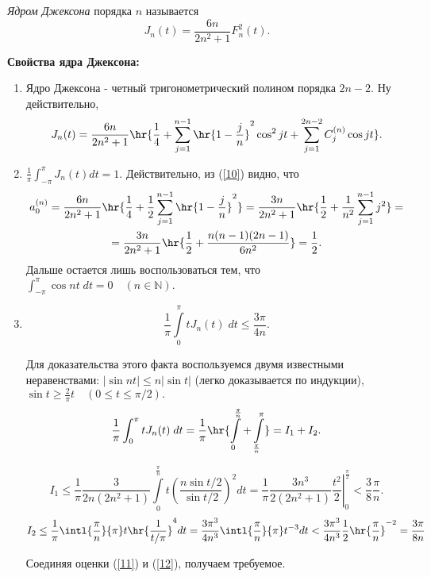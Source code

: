 \documentclass[a4paper]{article}
\begin{document}
\begin{df}
  \emph{Ядром Джексона} порядка $n$
  называется
  $$J_n(t)=\frac{6n}{2n^2+1}F_n^2(t).$$
\end{df}

\noindent\textbf{Свойства ядра Джексона:}
\begin{enumerate}
\item
Ядро Джексона - четный тригонометрический полином порядка $2n-2.$ Ну
действительно,
\begin{equation}\label{10}
J_n(t)=\frac{6n}{2n^2+1}\hr{\frac14+\sum_{j=1}^{n-1}
\hr{1-\frac jn}^2\cos^2 jt+\sum_{j=1}^{2n-2}C_j^{(n)}\cos
jt}.
\end{equation}
\item
$\frac1{\pi}\int_{-\pi}^{\pi}J_n(t)dt=1.$ Действительно, из
(\ref{10}) видно, что
\begin{multline*}
a_0^{(n)}=\frac{6n}{2n^2+1}\hr{\frac14+\frac12\sum_{j=1}^{n-1}
\hr{1-\frac jn}^2}=\frac{3n}{2n^2+1}\hr{\frac12+\frac1{n^2}\sum_{j=1}^{n-1}j^2}=\\
=\frac{3n}{2n^2+1}\hr{\frac12+\frac{n(n-1)(2n-1)}{6n^2}}=\frac12.
\end{multline*}
Дальше остается лишь воспользоваться тем, что
$\int_{-\pi}^{\pi}\cos nt \;dt=0\quad(n\in\mathbb{N}).$
\item
$$\frac1{\pi}\int\limits_0^{\pi} tJ_n(t)\;dt\le\frac{3\pi}{4n}.$$

Для доказательства этого факта воспользуемся двумя известными
неравенствами: $|\sin nt|\le n|\sin t|$ (легко доказывается по
индукции), $\sin t\ge \frac2{\pi}t\quad (0\le t\le\pi/2).$
$$\frac1{\pi}\int_0^{\pi}
tJ_n(t)\;dt=\frac1{\pi}\hr{\int\limits_0^{\frac{\pi}{n}}+\int\limits_{\frac{\pi}{n}}^{\pi}}=I_1+I_2.$$

\begin{equation}\label{11}
I_1\le\frac1{\pi}\frac{3}{2n(2n^2+1)}\int\limits_0^{\frac{\pi}{n}}
t\left(\frac{n\sin t/2}{\sin t/2}\right)^2dt=
\left.\frac1{\pi}\frac{3n^3}{2(2n^2+1)}\frac{t^2}2\right|_0^{\frac{\pi}2}<\frac38\frac{\pi}n.
\end{equation}
\begin{equation}\label{12}
I_2\le\frac1{\pi}\intl{\frac{\pi}{n}}{\pi}
t\hr{\frac1{t/\pi}}^4dt=\frac{3\pi^3}{4n^3}\intl{\frac{\pi}{n}}{\pi}t^{-3}dt<\frac{3\pi^3}{4n^3}\frac12\hr{\frac{\pi}n}^{-2}=\frac{3\pi}{8n}
\end{equation}

Соединяя оценки (\ref{11}) и (\ref{12}), получаем требуемое.
\end{enumerate}
\end{document}
